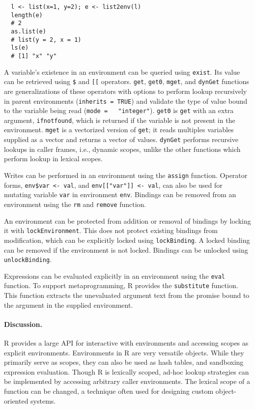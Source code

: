 \documentclass[10pt,review,sigplan,anonymous=true,authorversion=true,nonacm=true]{acmart}
\newcommand{\code}[1]{\lstinline |#1|\xspace}
\newcommand{\subDollar}{\code{$}}
\newcommand{\subBracket}{\code{[[}}
\newcommand{\exist}{\code{exist}}
\newcommand{\get}{\code{get}}
\newcommand{\getZero}{\code{get0}}
\newcommand{\mget}{\code{mget}}
\newcommand{\dynGet}{\code{dynGet}}
\newcommand{\assign}{\code{assign}}
\newcommand{\remove}{\code{remove}}
\renewcommand{\rm}{\code{rm}}
\newcommand{\lockEnvironment}{\code{lockEnvironment}}
\newcommand{\lockBinding}{\code{lockBinding}}
\newcommand{\unlockBinding}{\code{unlockBinding}}
\newcommand{\eval}{\code{eval}}
\newcommand{\substitute}{\code{substitute}}
\begin{document}
\begin{lstlisting}
  l <- list(x=1, y=2); e <- list2env(l)
  length(e)
  # 2
  as.list(e)
  # list(y = 2, x = 1)
  ls(e)
  # [1] "x" "y"
\end{lstlisting}

\noindent
A variable's existence in an environment can be queried using \exist. Its value
can be retrieved using \subDollar and \subBracket operators. \get, \getZero,
\mget, and \dynGet functions are generalizations of these operators with options
to perform lookup recursively in parent environments (\code{inherits = TRUE})
and validate the type of value bound to the variable being read (\code{mode =
  "integer"}). \getZero is \get with an extra argument, \code{ifnotfound}, which
is returned if the variable is not present in the environment. \mget is a
vectorized version of \get; it reads multiples variables supplied as a vector
and returns a vector of values. \dynGet performs recursive lookups in caller
frames, i.e., dynamic scopes, unlike the other functions which perform lookup in
lexical scopes.

Writes can be performed in an environment using the \assign function. Operator
forms, \code{env$var <- val}, and \code{env[["var"]] <- val}, can also be used
for mutating variable \code{var} in environment \code{env}. Bindings
can be removed from an environment using the \rm and \remove function.

An environment can be protected from addition or removal of bindings by locking
it with \lockEnvironment. This does not protect existing bindings from
modification, which can be explicitly locked using \lockBinding. A locked
binding can be removed if the environment is not locked. Bindings can be
unlocked using \unlockBinding.

Expressions can be evaluated explicitly in an environment using the \eval
function. To support metaprogramming, R provides the \substitute function. This
function extracts the unevaluated argument text from the promise bound to the
argument in the supplied environment.

\paragraph{Discussion.}
R provides a large API for interactive with environments and accessing scopes as
explicit environments. Environments in R are very versatile objects. While they
primarily serve as scopes, they can also be used as hash tables, and sandboxing
expression evaluation. Though R is lexically scoped, ad-hoc lookup strategies
can be implemented by accessing arbitrary caller environments. The lexical scope
of a function can be changed, a technique often used for designing custom
object-oriented systems.
\end{document}
